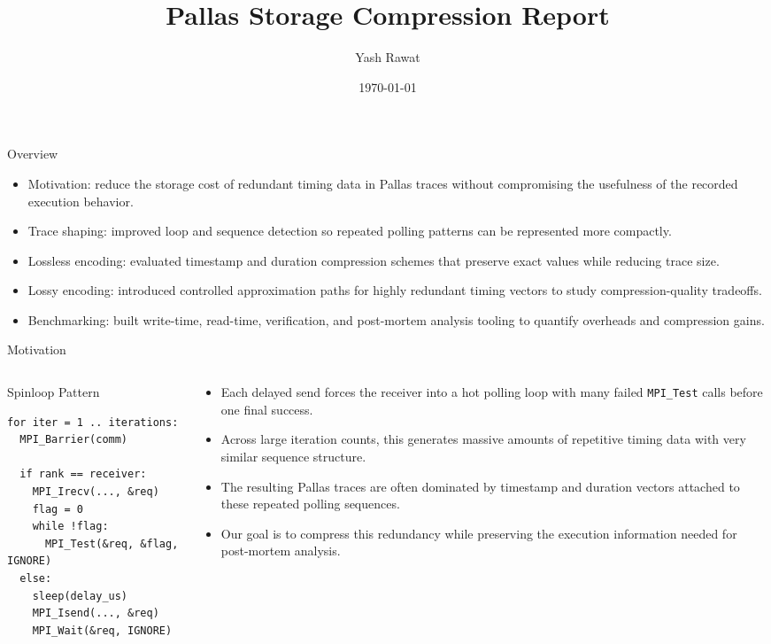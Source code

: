 \documentclass[10pt,aspectratio=169]{beamer}
\title{Pallas Storage Compression Report}
\author{Yash Rawat}
\institute{Telecom SudParis, France}
\date{\today}
\begin{document}
\begin{frame}
  \titlepage
\end{frame}

\begin{frame}{Overview}
  \begin{itemize}
    \item<1-> Motivation: reduce the storage cost of redundant timing data in Pallas traces without compromising the usefulness of the recorded execution behavior.
    \item<2-> Trace shaping: improved loop and sequence detection so repeated polling patterns can be represented more compactly.
    \item<3-> Lossless encoding: evaluated timestamp and duration compression schemes that preserve exact values while reducing trace size.
    \item<4-> Lossy encoding: introduced controlled approximation paths for highly redundant timing vectors to study compression-quality tradeoffs.
    \item<5-> Benchmarking: built write-time, read-time, verification, and post-mortem analysis tooling to quantify overheads and compression gains.
  \end{itemize}
\end{frame}

\begin{frame}[fragile]{Motivation}
  \begin{columns}[T]
    \begin{column}{0.5\textwidth}
      \begin{block}{Spinloop Pattern}
\small
\begin{verbatim}
for iter = 1 .. iterations:
  MPI_Barrier(comm)

  if rank == receiver:
    MPI_Irecv(..., &req)
    flag = 0
    while !flag:
      MPI_Test(&req, &flag, IGNORE)
  else:
    sleep(delay_us)
    MPI_Isend(..., &req)
    MPI_Wait(&req, IGNORE)
\end{verbatim}
      \end{block}
    \end{column}
    \begin{column}{0.48\textwidth}
      \begin{itemize}
        \item<2-> Each delayed send forces the receiver into a hot polling loop with many failed \texttt{MPI\_Test} calls before one final success.
        \item<3-> Across large iteration counts, this generates massive amounts of repetitive timing data with very similar sequence structure.
        \item<4-> The resulting Pallas traces are often dominated by timestamp and duration vectors attached to these repeated polling sequences.
        \item<5-> Our goal is to compress this redundancy while preserving the execution information needed for post-mortem analysis.
      \end{itemize}
    \end{column}
  \end{columns}
\end{frame}
\end{document}
